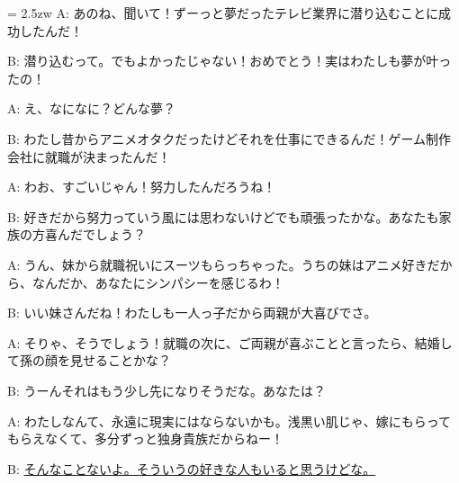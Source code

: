 \documentclass[11pt]{amsart}
\title{}
\author{}
\newenvironment{hangall}[1]{\hangindent = 2.5zw\everypar{\hangindent = 2.5zw}}{}
\begin{document}
\maketitle
\begin{hangall}{}%
A: あのね、聞いて！ずーっと夢だったテレビ業界に潜り込むことに成功したんだ！

B: 潜り込むって。でもよかったじゃない！おめでとう！実はわたしも夢が叶ったの！

A: え、なになに？どんな夢？

B: わたし昔からアニメオタクだったけどそれを仕事にできるんだ！ゲーム制作会社に就職が決まったんだ！

A: わお、すごいじゃん！努力したんだろうね！

B: 好きだから努力っていう風には思わないけどでも頑張ったかな。あなたも家族の方喜んだでしょう？

A: うん、妹から就職祝いにスーツもらっちゃった。うちの妹はアニメ好きだから、なんだか、あなたにシンパシーを感じるわ！

B: いい妹さんだね！わたしも一人っ子だから両親が大喜びでさ。

A: そりゃ、そうでしょう！就職の次に、ご両親が喜ぶことと言ったら、結婚して孫の顔を見せることかな？

B: うーんそれはもう少し先になりそうだな。あなたは？

A: わたしなんて、永遠に現実にはならないかも。浅黒い肌じゃ、嫁にもらってもらえなくて、多分ずっと独身貴族だからねー！

B: \ul{そんなことないよ。そういうの好きな人もいると思うけどな。}\end{hangall}
\end{document}
